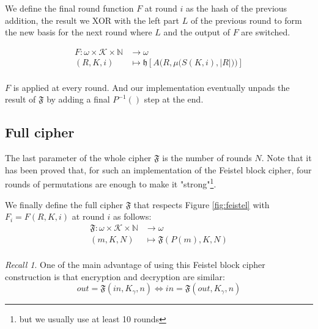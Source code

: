 \documentclass[twoside,twocolumn]{article}
\theoremstyle{definition}
\theoremstyle{remark}
\newtheorem*{recall}{Recall}
\begin{document}
We define the final round function $F$ at round $i$ as the hash of the previous addition, the result we XOR with the left part $L$ of the previous 
round to form the new basis for the next round where $L$ and the output of $F$ are switched.
\begin{small}
    \begin{equation}
        \label{eq:roundFunction}
        \begin{array}{rl}
            F: \omega \times \mathcal{K} \times \mathbb{N}  &\to \omega \\
                (R, K, i)  &\mapsto \mathfrak{h} \left[ A \Bigg(R, \mu \Big( S(K,i), |R| \Big) \Bigg) \right] \\
        \end{array}
    \end{equation}
\end{small}

$F$ is applied at every round. And our implementation eventually unpads the result of $\mathfrak{F}$ by adding a final $P^{-1}()$ step at the end.

\subsection{Full cipher}

The last parameter of the whole cipher $\mathfrak{F}$ is the number of rounds $N$.
Note that it has been proved \cite{Permutations:lr} that, for such an implementation of the Feistel block cipher, four rounds of permutations are 
enough to make it "strong"\footnote{but we usually use at least 10 rounds}.

We finally define the full cipher $\mathfrak{F}$ that respects Figure \ref{fig:feistel} with $F_i = F(R, K, i)$ at round $i$ as follows:
\begin{equation}
    \label{eq:fullCipher}
    \begin{array}{rl}
        \mathfrak{F}: \omega \times \mathcal{K} \times \mathbb{N} &\to \omega \\
                        (m, K, N) &\mapsto \mathfrak{F}(P(m), K, N) \\
    \end{array}
\end{equation}

\begin{recall}
    One of the main advantage of using this Feistel block cipher construction is that encryption and decryption are similar:$$
        out = \mathfrak{F}(in, K_\gamma, n) \iff in = \mathfrak{F}(out, K_\gamma, n)
    $$
\end{recall}
\end{document}
